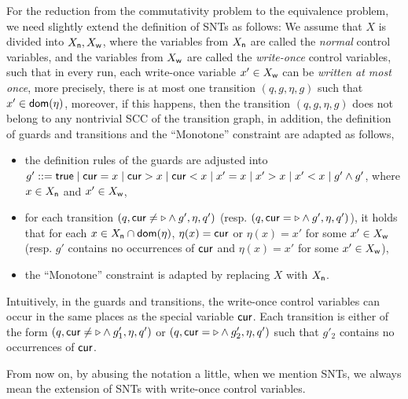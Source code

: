 For the reduction from the commutativity problem to the equivalence problem, we need slightly extend the definition of SNTs as follows: We assume that $X$ is divided into $X_{\sf n}, X_{\sf w}$, where the variables from $X_{\sf n}$ are called the \emph{normal} control variables, and the variables from $X_{\sf w}$ are called the \emph{write-once} control variables, such that in every run, each write-once variable $x' \in X_{\sf w}$ can be \emph{written at most once}, more precisely, there is at most one transition $(q, g, \eta, g)$ such that $x' \in \mathsf{dom}(\eta)$, moreover, if this happens, then the transition  $(q, g, \eta, g)$ does not  belong to any nontrivial SCC of the transition graph, in addition,  the definition of guards and transitions and the ``Monotone'' constraint are adapted as follows,
\begin{itemize}
\item the definition rules of the guards are adjusted into $g'::= \mathsf{true} \mid \mathsf{cur} = x \mid \mathsf{cur} > x \mid \mathsf{cur} < x \mid x' = x \mid x' > x \mid x' < x \mid g' \wedge g'$, where $x \in X_{\sf n}$ and $x' \in X_{\sf w}$,
%
\item for each transition $(q,\mathsf{cur} \neq \triangleright \wedge g', \eta, q')$ (resp. $(q,\mathsf{cur} = \triangleright \wedge g', \eta, q')$), it holds that for each $x \in X_{\sf n} \cap \mathsf{dom}(\eta)$, $\eta(x)  = \mathsf{cur}$ or $\eta(x)=x'$ for some $x' \in X_{\sf w}$ (resp. $g'$ contains no occurrences of $\mathsf{cur}$ and $\eta(x)=x'$ for some $x' \in X_{\sf w}$),
\item the ``Monotone'' constraint is adapted by replacing $X$ with $X_{\sf n}$.
\end{itemize}
Intuitively, in the guards and transitions, the write-once control variables can occur in the same places as the special variable $\mathsf{cur}$. Each transition is either of the form $(q, \mathsf{cur} \neq \triangleright \wedge g'_1, \eta, q')$ or $(q, \mathsf{cur} = \triangleright \wedge g'_2, \eta, q')$ such that $g'_2$ contains no occurrences of $\mathsf{cur}$. 

From now on, by abusing the notation a little, when we mention SNTs, we always mean the extension of SNTs with write-once control variables.


